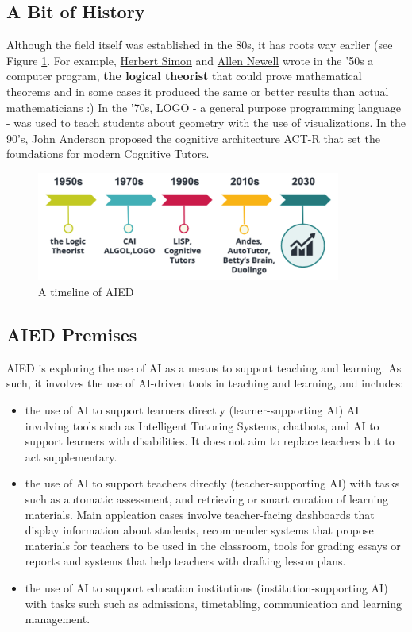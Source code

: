 \documentclass[
]{book}
\providecommand{\tightlist}{%
  \setlength{\itemsep}{0pt}\setlength{\parskip}{0pt}}
\begin{document}
\subsection{A Bit of History}\label{a-bit-of-history}

Although the field itself was established in the 80s, it has roots way earlier (see Figure \ref{fig:aiedstory}. For example, \href{https://en.wikipedia.org/wiki/Herbert_A._Simon}{Herbert Simon} and \href{https://en.wikipedia.org/wiki/Allen_Newell}{Allen Newell} wrote in the '50s a computer program, \textbf{the logical theorist} that could prove mathematical theorems and in some cases it produced the same or better results than actual mathematicians :) In the '70s, LOGO - a general purpose programming language - was used to teach students about geometry with the use of visualizations. In the 90's, John Anderson proposed the cognitive architecture ACT-R that set the foundations for modern Cognitive Tutors.

\begin{figure}
\includegraphics[width=10cm]{./images/AIEDhistory} \caption{A timeline of AIED}\label{fig:aiedstory}
\end{figure}

\subsection{AIED Premises}\label{aied-premises}

AIED is exploring the use of AI as a means to support teaching and learning. As such, it involves the use of AI-driven tools in teaching and learning, and includes:

\begin{itemize}
\tightlist
\item
  the use of AI to support learners directly (learner-supporting AI) AI involving tools such as Intelligent Tutoring Systems, chatbots, and AI to support learners with disabilities. It does not aim to replace teachers but to act supplementary.
\item
  the use of AI to support teachers directly (teacher-supporting AI) with tasks such as automatic assessment, and retrieving or smart curation of learning materials. Main applcation cases involve teacher-facing dashboards that display information about students, recommender systems that propose materials for teachers to be used in the classroom, tools for grading essays or reports and systems that help teachers with drafting lesson plans.
\item
  the use of AI to support education institutions (institution-supporting AI) with tasks such such as admissions, timetabling, communication and learning management.
\end{itemize}
\end{document}
